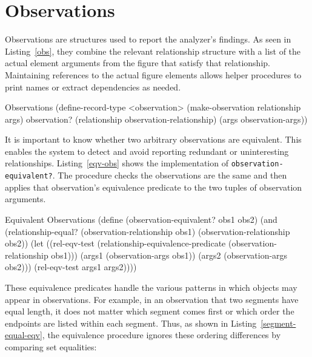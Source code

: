 \section{Observations}
\label{sec:obs}

Observations are structures used to report the analyzer's findings. As
seen in Listing~\ref{obs}, they combine the relevant relationship
structure with a list of the actual element arguments from the figure
that satisfy that relationship. Maintaining references to the actual
figure elements allows helper procedures to print names or extract
dependencies as needed.

\begin{code-listing}
[label=obs]
{Observations}
(define-record-type <observation>
  (make-observation relationship args)
  observation?
  (relationship observation-relationship)
  (args observation-args))
\end{code-listing}

It is important to know whether two arbitrary observations are
equivalent. This enables the system to detect and avoid reporting
redundant or uninteresting relationships.  Listing~\ref{eqv-obs} shows
the implementation of \texttt{observation-equivalent?}. The procedure
checks the observations are the same and then applies that
observation's equivalence predicate to the two tuples of observation
arguments.

\begin{code-listing}
[label=eqv-obs]
{Equivalent Observations}
(define (observation-equivalent? obs1 obs2)
  (and (relationship-equal?
        (observation-relationship obs1)
        (observation-relationship obs2))
       (let ((rel-eqv-test
              (relationship-equivalence-predicate
               (observation-relationship obs1)))
             (args1 (observation-args obs1))
             (args2 (observation-args obs2)))
         (rel-eqv-test args1 args2))))
\end{code-listing}

These equivalence predicates handle the various patterns in which
objects may appear in observations. For example, in an observation
that two segments have equal length, it does not matter which segment
comes first or which order the endpoints are listed within each
segment. Thus, as shown in Listing~\ref{segment-equal-eqv}, the
equivalence procedure ignores these ordering differences by comparing
set equalities:


